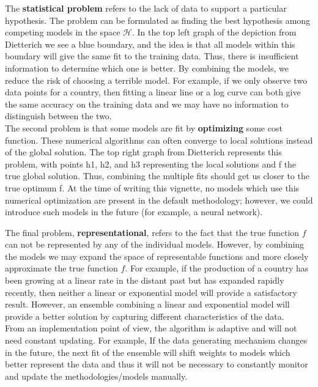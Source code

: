 \documentclass[nojss]{jss}
\begin{document}
The \textbf{statistical problem} refers to the lack of data to support a
particular hypothesis. The problem can be formulated as finding the
best hypothesis among competing models in the space
$\mathbf{\mathcal{H}}$. In the top left graph of the
depiction from Dietterich we see a blue boundary, and the idea is that all
models within this boundary will give the same fit to the training data.
Thus, there is insufficient information to determine which one is better.
By combining the models, we reduce the risk of choosing a terrible model.
For example, if we only observe two data points for a country, then
fitting a linear line or a log curve can both give the same accuracy
on the training data and we may have no information to distinguish
between the two.\\

The second problem is that some models are fit by  \textbf{optimizing} some cost function.  These numerical algorithms can often converge to local solutions instead of the global solution.  The top right graph from Dietterich represents this problem, with points h1, h2, and h3 representing the local solutions and f the true global solution.  Thus, combining the multiple fits should get us closer to the true optimum f.  At the time of writing this vignette, no models which use this numerical optimization are present in the default methodology; however, we could introduce such models in the future (for example, a neural network).

The final problem,  \textbf{representational}, refers to the fact that the true
function $f$ can not be represented by any of the individual models. However, by
combining the models we may expand the space of representable
functions and more closely approximate the true function $f$.  For example, if
the production of a country has been growing at a linear rate in the
distant past but has expanded rapidly recently, then neither a linear or
exponential model will provide a satisfactory result. However, an
ensemble combining a linear and exponential model will provide a better
solution by capturing different characteristics of the data.\\

From an implementation point of view, the algorithm is adaptive and will not need constant updating.  For example, If the data generating mechanism changes in the future, the next fit of the ensemble will shift weights to models which better represent the data and thus it will not be necessary to constantly monitor and update the methodologies/models manually.
\end{document}
